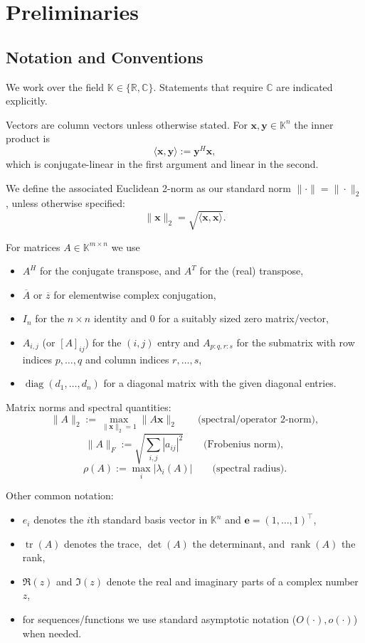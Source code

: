 \chapter{Preliminaries}
\label{chap:preliminaries}

\section{Notation and Conventions}
\label{sec:notation-conventions}

We work over the field $\mathbb{K}\in\{\mathbb{R},\mathbb{C}\}$. Statements that require $\mathbb{C}$ are indicated explicitly.

Vectors are column vectors unless otherwise stated. For $\mathbf{x},\mathbf{y}\in\mathbb{K}^n$ the inner product is
\[
    \langle \mathbf{x},\mathbf{y}\rangle := \mathbf{y}^H \mathbf{x},
\]
which is conjugate-linear in the first argument and linear in the second.

We define the associated Euclidean 2-norm as our standard norm $\|\cdot\| = \|\cdot\|_2$, unless otherwise specified:
\[
    \|\mathbf{x}\|_2=\sqrt{\langle\mathbf{x},\mathbf{x}\rangle}.
\]

For matrices $A\in\mathbb{K}^{m\times n}$ we use
\begin{itemize}
    \item $A^H$ for the conjugate transpose, and $A^T$ for the (real) transpose,
    \item $\overline{A}$ or $\overline{z}$ for elementwise complex conjugation,
    \item $I_n$ for the $n\times n$ identity and $0$ for a suitably sized zero matrix/vector,
    \item $A_{i,j}$ (or $[A]_{ij}$) for the $(i,j)$ entry and $A_{p:q,r:s}$ for the submatrix with row indices $p,\dots,q$ and column indices $r,\dots,s$,
    \item $\operatorname{diag}(d_1,\dots,d_n)$ for a diagonal matrix with the given diagonal entries.
\end{itemize}

Matrix norms and spectral quantities:
\[
    \|A\|_2 := \max_{\|\mathbf{x}\|_2=1}\|A\mathbf{x}\|_2 \qquad\text{(spectral/operator 2-norm)},
\]
\[
    \|A\|_F := \sqrt{\sum_{i,j}|a_{ij}|^2}\qquad\text{(Frobenius norm)},
\]
\[
    \rho(A) := \max_i |\lambda_i(A)|\qquad\text{(spectral radius)}.
\]

Other common notation:
\begin{itemize}
    \item $e_i$ denotes the $i$th standard basis vector in $\mathbb{K}^n$ and $\mathbf{e}=(1,\dots,1)^\top$,
    \item $\operatorname{tr}(A)$ denotes the trace, $\det(A)$ the determinant, and $\operatorname{rank}(A)$ the rank,
    \item $\Re(z)$ and $\Im(z)$ denote the real and imaginary parts of a complex number $z$,
    \item for sequences/functions we use standard asymptotic notation ($O(\cdot), o(\cdot)$) when needed.
\end{itemize}

